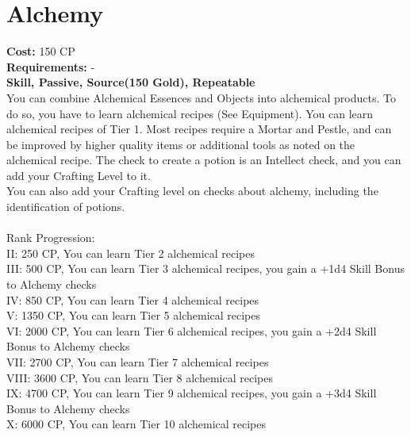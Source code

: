 \section{Alchemy}\label{perk:alchemy}
\textbf{Cost:} 150 CP\\
\textbf{Requirements:} -\\
\textbf{Skill, Passive, Source(150 Gold), Repeatable}\\
You can combine Alchemical Essences and Objects into alchemical products.
To do so, you have to learn alchemical recipes (See Equipment).
You can learn alchemical recipes of Tier 1.
Most recipes require a Mortar and Pestle, and can be improved by higher quality items or additional tools as noted on the alchemical recipe.
The check to create a potion is an Intellect check, and you can add your Crafting Level to it.\\
You can also add your Crafting level on checks about alchemy, including the identification of potions.\\
\\
Rank Progression:\\
II: 250 CP, You can learn Tier 2 alchemical recipes\\
III: 500 CP, You can learn Tier 3 alchemical recipes, you gain a +1d4 Skill Bonus to Alchemy checks\\
IV: 850 CP, You can learn Tier 4 alchemical recipes\\
V: 1350 CP, You can learn Tier 5 alchemical recipes\\
VI: 2000 CP, You can learn Tier 6 alchemical recipes, you gain a +2d4 Skill Bonus to Alchemy checks\\
VII: 2700 CP, You can learn Tier 7 alchemical recipes\\
VIII: 3600 CP, You can learn Tier 8 alchemical recipes\\
IX: 4700 CP, You can learn Tier 9 alchemical recipes, you gain a +3d4 Skill Bonus to Alchemy checks\\
X: 6000 CP, You can learn Tier 10 alchemical recipes\\